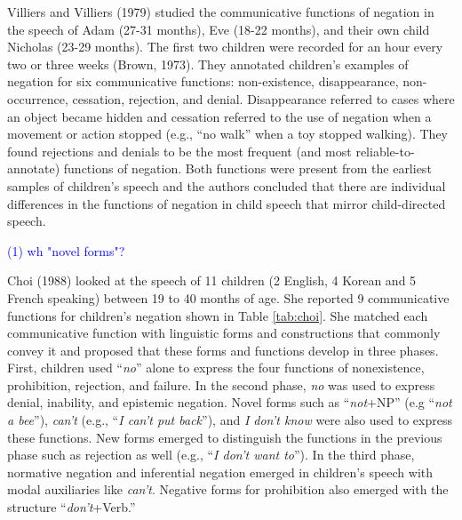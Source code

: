 \documentclass[
  english,
  man,floatsintext]{apa6}
\begin{document}
Villiers and Villiers (1979) studied the communicative functions of negation in the speech of Adam (27-31 months), Eve (18-22 months), and their own child Nicholas (23-29 months). The first two children were recorded for an hour every two or three weeks (Brown, 1973). They annotated children's examples of negation for six communicative functions: non-existence, disappearance, non-occurrence, cessation, rejection, and denial. Disappearance referred to cases where an object became hidden and cessation referred to the use of negation when a movement or action stopped (e.g., ``no walk'' when a toy stopped walking). They found rejections and denials to be the most frequent (and most reliable-to-annotate) functions of negation. Both functions were present from the earliest samples of children's speech and the authors concluded that there are individual differences in the functions of negation in child speech that mirror child-directed speech.

\textcolor{blue}{(1) wh "novel forms"?}

Choi (1988) looked at the speech of 11 children (2 English, 4 Korean and 5 French speaking) between 19 to 40 months of age. She reported 9 communicative functions for children's negation shown in Table \ref{tab:choi}. She matched each communicative function with linguistic forms and constructions that commonly convey it and proposed that these forms and functions develop in three phases. First, children used ``\emph{no}'' alone to express the four functions of nonexistence, prohibition, rejection, and failure. In the second phase, \emph{no} was used to express denial, inability, and epistemic negation. Novel forms such as ``\emph{not}+NP'' (e.g ``\emph{not a bee}''), \emph{can't} (e.g., ``\emph{I can't put back}''), and \emph{I don't know} were also used to express these functions. New forms emerged to distinguish the functions in the previous phase such as rejection as well (e.g., ``\emph{I don't want to}''). In the third phase, normative negation and inferential negation emerged in children's speech with modal auxiliaries like \emph{can't}. Negative forms for prohibition also emerged with the structure ``\emph{don't}+Verb.''
\end{document}
